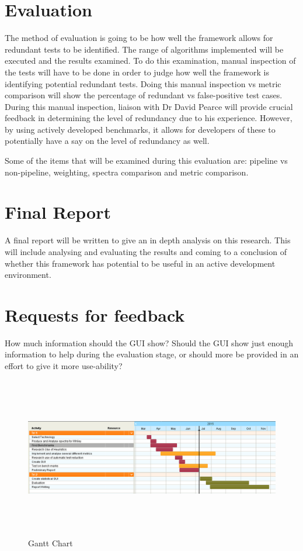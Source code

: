 \section{Evaluation}
The method of evaluation is going to be how well the framework allows for redundant tests to be identified. The range of algorithms implemented will be executed and the results examined. To do this examination, manual inspection of the tests will have to be done in order to judge how well the framework is identifying potential redundant tests. Doing this manual inspection vs metric comparison will show the percentage of redundant vs false-positive test cases. During this manual inspection, liaison with Dr David Pearce will provide crucial feedback in determining the level of redundancy due to his experience. However, by using actively developed benchmarks, it allows for developers of these to potentially have a say on the level of redundancy as well. 

Some of the items that will be examined during this evaluation are: pipeline vs non-pipeline, weighting, spectra comparison and metric comparison.

\section{Final Report}
A final report will be written to give an in depth analysis on this research. This will include analysing and evaluating the results and coming to a conclusion of whether this framework has potential to be useful in an active development environment. 

\section{Requests for feedback}
How much information should the GUI show? Should the GUI show just enough information to help during the evaluation stage, or should more be provided in an effort to give it more use-ability?

\begin{figure}[h]
\centering
\includegraphics[width=17cm,height=7cm]{model28.png}
\caption{Gantt Chart}
\label{fig:gantt}
\end{figure}